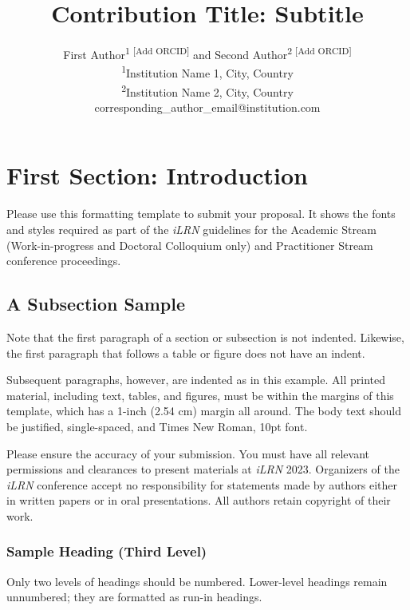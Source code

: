 \documentclass{iLRNConfProc}
\title{Contribution Title: Subtitle}
\author{
\begin{minipage}{\textwidth}
\centering
First Author\textsuperscript{1 [Add ORCID]} and Second Author\textsuperscript{2 [Add ORCID]} \\
\textsuperscript{1}Institution Name 1, City, Country \\
\textsuperscript{2}Institution Name 2, City, Country \\
corresponding\_author\_email@institution.com
\end{minipage}
}
\date{}
\begin{document}
\maketitle
\thispagestyle{empty}



\section{First Section: Introduction}
Please use this formatting template to submit your proposal. It shows the fonts and styles required as part of the \textit{iLRN} guidelines for the Academic Stream (Work-in-progress and Doctoral Colloquium only) and Practitioner Stream conference proceedings.

\subsection{A Subsection Sample}
Note that the first paragraph of a section or subsection is not indented. Likewise, the first paragraph that follows a table or figure does not have an indent.

\indent Subsequent paragraphs, however, are indented as in this example. All printed material, including text, tables, and figures, must be within the margins of this template, which has a 1-inch (2.54 cm) margin all around. The body text should be justified, single-spaced, and Times New Roman, 10pt font.

Please ensure the accuracy of your submission. You must have all relevant permissions and clearances to present materials at \textit{iLRN} 2023. Organizers of the \textit{iLRN} conference accept no responsibility for statements made by authors either in written papers or in oral presentations. All authors retain copyright of their work.

\subsubsection*{Sample Heading (Third Level)}
Only two levels of headings should be numbered. Lower-level headings remain unnumbered; they are formatted as run-in headings.
\end{document}
